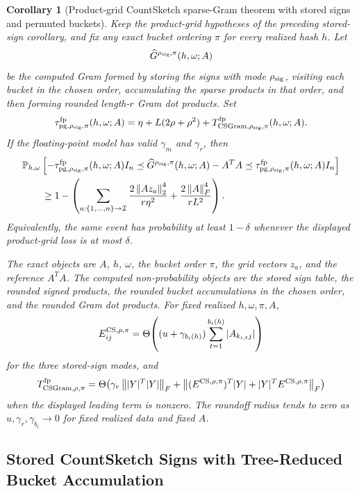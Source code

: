 \documentclass[11pt]{article}
\newcommand{\Prob}{\mathbb{P}}
\newcommand{\Frob}[1]{\left\lVert #1\right\rVert_F}
\newcommand{\Norm}[1]{\left\lVert #1\right\rVert_2}
\newcommand{\I}{I}
\newtheorem{corollary}[theorem]{Corollary}
\theoremstyle{remark}
\begin{document}
\begin{corollary}[Product-grid CountSketch sparse-Gram theorem with stored signs and permuted buckets]
Keep the product-grid hypotheses of the preceding stored-sign corollary, and
fix any exact bucket ordering \(\pi\) for every realized hash \(h\).  Let
\[
  \widehat G^{\rho_{\rm sig},\pi}(h,\omega;A)
\]
be the computed Gram formed by storing the signs with mode
\(\rho_{\rm sig}\), visiting each bucket in the chosen order, accumulating
the sparse products in that order, and then forming rounded length-\(r\) Gram
dot products.  Set
\[
  \tau_{{\rm pg},\rho_{\rm sig},\pi}^{\rm fp}(h,\omega;A)
  =
  \eta+L(2\rho+\rho^2)
  +
  T_{{\rm CSGram},\rho_{\rm sig},\pi}^{\rm fp}(h,\omega;A).
\]
If the floating-point model has valid \(\gamma_m\) and \(\gamma_r\), then
\[
\begin{aligned}
&\Prob_{h,\omega}
  \left[
    -\tau_{{\rm pg},\rho_{\rm sig},\pi}^{\rm fp}(h,\omega;A)\I_n
    \preceq
    \widehat G^{\rho_{\rm sig},\pi}(h,\omega;A)-A^TA
    \preceq
    \tau_{{\rm pg},\rho_{\rm sig},\pi}^{\rm fp}(h,\omega;A)\I_n
  \right]
\\
&\qquad\ge
  1-
  \left(
    \sum_{a:\{1,\ldots,n\}\to\mathcal I}
      \frac{2\Norm{Az_a}^4}{r\eta^2}
    +
      \frac{2\Frob{A}^4}{rL^2}
  \right).
\end{aligned}
\]
Equivalently, the same event has probability at least \(1-\delta\) whenever
the displayed product-grid loss is at most \(\delta\).

The exact objects are \(A\), \(h\), \(\omega\), the bucket order \(\pi\), the
grid vectors \(z_a\), and the reference \(A^TA\).  The computed
non-probability objects are the stored sign table, the rounded signed
products, the rounded bucket accumulations in the chosen order, and the
rounded Gram dot products.  For fixed realized \(h,\omega,\pi,A\),
\[
  E^{{\rm CS},\rho,\pi}_{ij}
  =
  \Theta\!\left(
    (u+\gamma_{b_i(h)})
    \sum_{t=1}^{b_i(h)}|A_{k_{i,t}j}|
  \right)
\]
for the three stored-sign modes, and
\[
  T_{{\rm CSGram},\rho,\pi}^{\rm fp}
  =
  \Theta\!\left(
    \gamma_r\Frob{|Y|^T|Y|}
    +
    \Frob{(E^{{\rm CS},\rho,\pi})^T|Y|
      +|Y|^TE^{{\rm CS},\rho,\pi}}
  \right)
\]
when the displayed leading term is nonzero.  The roundoff radius tends to zero
as \(u,\gamma_r,\gamma_{b_i}\to0\) for fixed realized data and fixed \(A\).
\end{corollary}

\subsection*{Stored CountSketch Signs with Tree-Reduced Bucket Accumulation}
\end{document}
